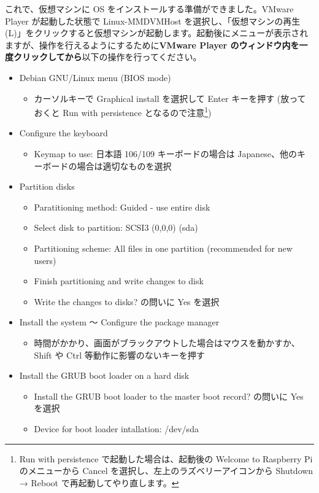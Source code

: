 \documentclass[a4j,oneside]{ujbook}
\begin{document}
これで、仮想マシンに OS をインストールする準備ができました。VMware Player が起動した状態で Linux-MMDVMHost を選択し、「仮想マシンの再生(L)」をクリックすると仮想マシンが起動します。起動後にメニューが表示されますが、操作を行えるようにするために\textbf{VMware Player のウィンドウ内を一度クリックしてから}以下の操作を行ってください。

\begin{itemize}
 \item Debian GNU/Linux menu (BIOS mode)
 \begin{itemize}
  \item カーソルキーで Graphical install を選択して Enter キーを押す (放っておくと Run with persistence となるので注意\footnote{Run with persistence で起動した場合は、起動後の Welcome to Raspberry Pi のメニューから Cancel を選択し、左上のラズベリーアイコンから Shutdown → Reboot で再起動してやり直します。})
 \end{itemize}
 \item Configure the keyboard
 \begin{itemize}
  \item Keymap to use: 日本語 106/109 キーボードの場合は Japanese、他のキーボードの場合は適切なものを選択
 \end{itemize}
 \item Partition disks
 \begin{itemize}
  \item Paratitioning method: Guided - use entire disk
  \item Select disk to partition: SCSI3 (0,0,0) (sda)
  \item Partitioning scheme: All files in one partition (recommended for new users)
  \item Finish partitioning and write changes to disk
  \item Write the changes to disks? の問いに Yes を選択
 \end{itemize}
 \item Install the system 〜 Configure the package manager
 \begin{itemize}
  \item 時間がかかり、画面がブラックアウトした場合はマウスを動かすか、 Shift や Ctrl 等動作に影響のないキーを押す
 \end{itemize}
 \item Install the GRUB boot loader on a hard disk
 \begin{itemize}
  \item Install the GRUB boot loader to the master boot record? の問いに Yes を選択
  \item Device for boot loader intallation: /dev/sda
 \end{itemize}
\end{itemize}
\end{document}
